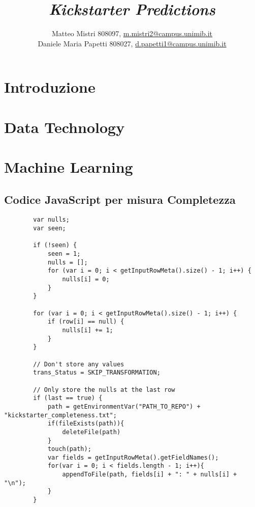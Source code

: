 \documentclass[11pt, a4paper]{report}
\title{\emph{Kickstarter Predictions}}
\author{Matteo Mistri 808097, \href{m.mistri2@campus.unimib.it}{m.mistri2@campus.unimib.it}\\%
	Daniele Maria Papetti 808027, \href{d.papetti1@campus.unimib.it}{d.papetti1@campus.unimib.it}}
\begin{document}
	
\clearpage
\maketitle


\tableofcontents
\newpage

\hypersetup{pdfborder = 0 0 0, 	colorlinks, urlcolor=blue, linkcolor=black}
\setcounter{page}{1}
\chapter{Introduzione}

\chapter{Data Technology}

\chapter{Machine Learning}


\begin{appendices}
	\chapter{Codice JavaScript per misura Completezza}
	\begin{lstlisting}
		var nulls;
		var seen;
		
		if (!seen) {
			seen = 1;
			nulls = [];
			for (var i = 0; i < getInputRowMeta().size() - 1; i++) {
				nulls[i] = 0;
			}
		}
		
		for (var i = 0; i < getInputRowMeta().size() - 1; i++) {
			if (row[i] == null) {
				nulls[i] += 1;
			}
		}
		
		// Don't store any values
		trans_Status = SKIP_TRANSFORMATION;
		
		// Only store the nulls at the last row
		if (last == true) {
			path = getEnvironmentVar("PATH_TO_REPO") + "kickstarter_completeness.txt";
			if(fileExists(path)){
				deleteFile(path)
			}
			touch(path);
			var fields = getInputRowMeta().getFieldNames();
			for(var i = 0; i < fields.length - 1; i++){
				appendToFile(path, fields[i] + ": " + nulls[i] + "\n");
			}
		}
	\end{lstlisting}
\end{appendices}
\end{document}
